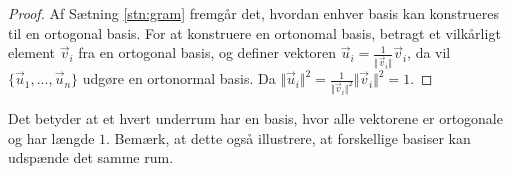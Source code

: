 \begin{proof}
Af Sætning \ref{stn:gram} fremgår det, hvordan enhver basis kan konstrueres til en ortogonal basis. 
For at konstruere en ortonomal basis, betragt et vilkårligt element $\vec{v}_i$ fra en ortogonal basis, og definer vektoren $\vec{u}_i = \frac{1}{\Vert\vec{v}_i\Vert}\vec{v}_i$, da vil $\{\vec{u}_1,...,\vec{u}_n\}$ udgøre en ortonormal basis. 
Da $\Vert\vec{u}_i\Vert^2 = \frac{1}{\Vert\vec{v}_i\Vert^2}\Vert\vec{v}_i\Vert^2 = 1$.
\end{proof}
Det betyder at et hvert underrum har en basis, hvor alle vektorene er ortogonale og har længde $1$.
Bemærk, at dette også illustrere, at forskellige basiser kan udspænde det samme rum. 



 
